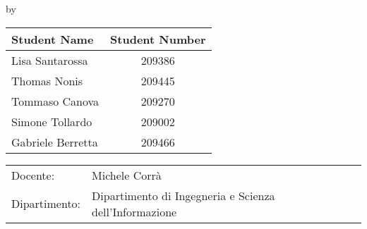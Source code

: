 \begin{titlepage}

\begin{center}

{\makeatletter
\largetitlestyle\fontsize{35}{35}\selectfont\@title
\makeatother}

{\makeatletter
\ifdefvoid{\@subtitle}{}{\bigskip\bigskip\qquad \; \titlestyle\fontsize{15}{15}\selectfont\@subtitle}
\makeatother}

\bigskip
\bigskip

by
 
\bigskip
\bigskip

\setlength\extrarowheight{2pt}
\begin{tabular}{lc}
    Student Name & Student Number \\\midrule
    Lisa Santarossa & 209386\\
    Thomas Nonis & 209445\\
    Tommaso Canova & 209270\\
    Simone Tollardo & 209002\\
    Gabriele Berretta & 209466 \\
\end{tabular}

\vfill

\begin{tabular}{ll}
    Docente: & Michele Corrà \\
    Dipartimento: & Dipartimento di Ingegneria e Scienza dell'Informazione
\end{tabular}

\bigskip
\bigskip

\end{center}

\end{titlepage}
